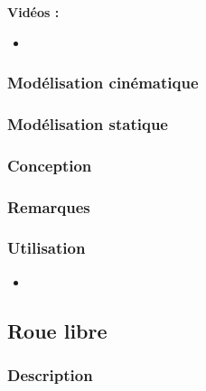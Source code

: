 \documentclass[11pt,oneside]{article}
\begin{document}
\textbf{Vidéos :}
\begin{itemize}
\item
\end{itemize}

\subsubsection{Modélisation cinématique}
\subsubsection{Modélisation statique}
\subsubsection{Conception}
\subsubsection{Remarques}
\subsubsection{Utilisation}
\begin{itemize}
\item
\end{itemize}
\newpage

\subsection{Roue libre}
\subsubsection{Description}
\end{document}
